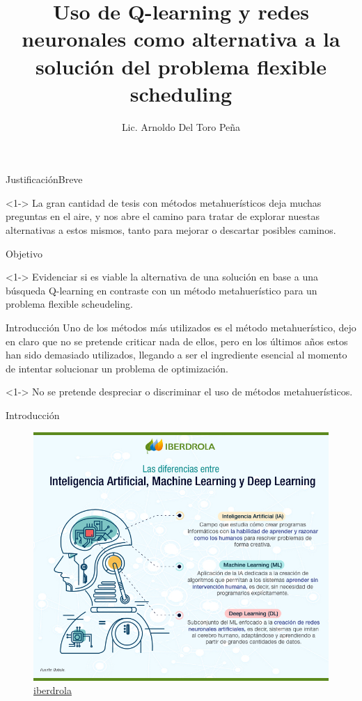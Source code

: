 \documentclass{beamer}
\title{Uso de Q-learning y redes neuronales como alternativa a la solución del problema flexible scheduling}
\author{Lic. Arnoldo Del Toro Peña }
\institute{Universidad Autónoma de Nuevo León}
\begin{document}
\begin{frame}
 \titlepage
\end{frame}

\begin{frame}{Justificación}{Breve}
\begin{block}<1->{}
    La gran cantidad de tesis con métodos metahuerísticos deja muchas preguntas en el aire, y nos abre el camino
    para tratar de explorar nuestas alternativas a estos mismos, tanto para mejorar o descartar posibles caminos.
\end{block}
\end{frame}

\begin{frame}{Objetivo}
\begin{block}<1->{}
    Evidenciar si es viable la alternativa de una solución en base a una búsqueda Q-learning en contraste con un método metahuerístico para un problema flexible scheudeling.
\end{block}

\end{frame}

\begin{frame}{Introducción}
    Uno de los métodos más utilizados es el método metahuerístico, dejo en claro que no se pretende criticar nada de ellos, pero en los últimos años estos han sido demasiado utilizados, llegando a ser el ingrediente esencial al momento de intentar solucionar un problema de optimización.

    \begin{block}<1->{}
        No se pretende despreciar o discriminar el uso de métodos metahuerísticos.
    \end{block}
\end{frame}

\begin{frame}{Introducción}
\begin{figure}[h!t]
\centering
\includegraphics[scale = 1 ]{Deep_Learning_ESP.png}
\caption{\href{https://www.iberdrola.com/innovacion/deep-learning}{iberdrola}}
\end{figure}
\end{frame}
\end{document}
